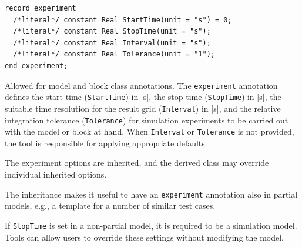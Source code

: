 \begin{annotationdefinition}[experiment]
\begin{synopsis}
\begin{lstlisting}[language=modelica]
record experiment
  /*literal*/ constant Real StartTime(unit = "s") = 0;
  /*literal*/ constant Real StopTime(unit = "s");
  /*literal*/ constant Real Interval(unit = "s");
  /*literal*/ constant Real Tolerance(unit = "1");
end experiment;
\end{lstlisting}
\end{synopsis}
\begin{semantics}
Allowed for model and block class annotations.
The \lstinline!experiment! annotation defines the start time (\lstinline!StartTime!) in {[}s{]}, the stop time (\lstinline!StopTime!) in {[}s{]}, the suitable time resolution for the result grid (\lstinline!Interval!) in {[}s{]}, and the relative integration tolerance (\lstinline!Tolerance!) for simulation experiments to be carried out with the model or block at hand.
When \lstinline!Interval! or \lstinline!Tolerance! is not provided, the tool is responsible for applying appropriate defaults.

The experiment options are inherited, and the derived class may override individual inherited options.
\begin{nonnormative}
The inheritance makes it useful to have an \lstinline!experiment! annotation also in partial models, e.g., a template for a number of similar test cases.
\end{nonnormative}

If \lstinline!StopTime! is set in a non-partial model, it is required to be a simulation model.
Tools can allow users to override these settings without modifying the model.
\end{semantics}
\end{annotationdefinition}

